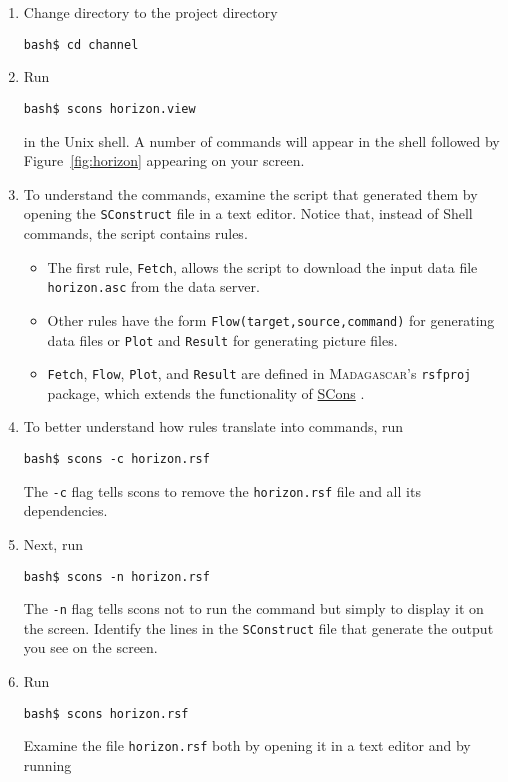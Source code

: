 \begin{enumerate}
\item Change directory to the project directory
\begin{verbatim}
bash$ cd channel
\end{verbatim}
\item Run
\begin{verbatim}
bash$ scons horizon.view
\end{verbatim}
in the Unix shell. A number of commands will appear in the shell followed by Figure~\ref{fig:horizon} appearing on your screen. 
\item To understand the commands, examine the script that generated them by opening the \texttt{SConstruct} file in a text editor. Notice that, instead of Shell commands, the script contains rules. 
\begin{itemize}
\item The first rule, \texttt{Fetch}, allows the script to download the input data file \texttt{horizon.asc} from the data server. 
\item Other rules have the form \texttt{Flow(target,source,command)} for generating data files or \texttt{Plot} and  \texttt{Result} for 
generating picture files. 
\item \texttt{Fetch}, \texttt{Flow}, \texttt{Plot}, and \texttt{Result} are defined in \textsc{Madagascar}'s \texttt{rsfproj} package, which extends the functionality of \href{http://www.scons.org}{SCons}
\cite[]{icassp}.
\end{itemize}
\item To better understand how rules translate into commands, run 
\begin{verbatim}
bash$ scons -c horizon.rsf
\end{verbatim}
The \texttt{-c} flag tells scons to remove the \texttt{horizon.rsf} file and all its dependencies.
\item Next, run
\begin{verbatim}
bash$ scons -n horizon.rsf
\end{verbatim}
The \texttt{-n} flag tells scons not to run the command but simply to display it on the screen. Identify the lines in the \texttt{SConstruct} file that generate the output you see on the screen.
\item Run
\begin{verbatim}
bash$ scons horizon.rsf
\end{verbatim}
Examine the file \texttt{horizon.rsf} both by opening it in a text editor and by running
\begin{verbatim}

\end{verbatim}
\end{enumerate}
